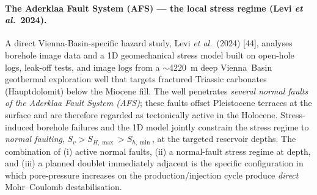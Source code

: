 \documentclass{article}
\begin{document}
\paragraph{The Aderklaa Fault System (AFS) --- the local stress regime
(Levi \emph{et al.}\ 2024).} A direct Vienna-Basin-specific hazard study,
Levi \emph{et al.}\ (2024) [44], analyses borehole image data and a 1D
geomechanical stress model built on open-hole logs, leak-off tests, and
image logs from a $\sim 4220$~m deep Vienna~Basin geothermal exploration
well that targets fractured Triassic carbonates (Hauptdolomit) below the
Miocene fill. The well penetrates \emph{several normal faults of the
Aderklaa Fault System (AFS)}; these faults offset Pleistocene terraces
at the surface and are therefore regarded as tectonically active in the
Holocene. Stress-induced borehole failures and the 1D model jointly
constrain the stress regime to \emph{normal faulting},
$S_v > S_{H,\max} > S_{h,\min}$, at the targeted reservoir depths. The
combination of (i) active normal faults, (ii) a normal-fault stress regime
at depth, and (iii) a planned doublet immediately adjacent is the
specific configuration in which pore-pressure increases on the
production/injection cycle produce \emph{direct} Mohr--Coulomb
destabilisation.
\end{document}
